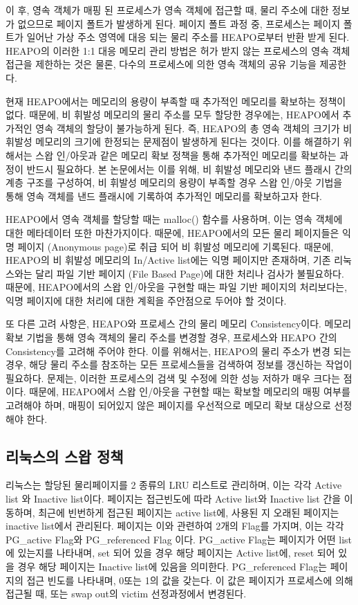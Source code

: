 \documentclass[letterpaper,twocolumn,10pt]{article}
\begin{document}
이 후, 영속 객체가 매핑 된 프로세스가 영속 객체에 접근할 때, 물리 주소에 대한 정보가 없으므로 페이지 폴트가 발생하게 된다. 페이지 폴트 과정 중, 프로세스는 페이지 폴트가 일어난 가상 주소 영역에 대응 되는 물리 주소를 HEAPO로부터 반환 받게 된다. HEAPO의 이러한 1:1 대응 메모리 관리 방법은 허가 받지 않는 프로세스의 영속 객체 접근을 제한하는 것은 물론, 다수의 프로세스에 의한 영속 객체의 공유 기능을 제공한다.

현재 HEAPO에서는 메모리의 용량이 부족할 때 추가적인 메모리를 확보하는 정책이 없다. 때문에, 비 휘발성 메모리의 물리 주소를 모두 할당한 경우에는, HEAPO에서 추가적인 영속 객체의 할당이 불가능하게 된다. 즉, HEAPO의 총 영속 객체의 크기가 비 휘발성 메모리의 크기에 한정되는 문제점이 발생하게 된다는 것이다. 이를 해결하기 위해서는 스왑 인/아웃과 같은 메모리 확보 정책을 통해 추가적인 메모리를 확보하는 과정이 반드시 필요하다. 본 논문에서는 이를 위해, 비 휘발성 메모리와 낸드 플래시 간의 계층 구조를 구성하여, 비 휘발성 메모리의 용량이 부족할 경우 스왑 인/아웃 기법을 통해 영속 객체를 낸드 플래시에 기록하여 추가적인 메모리를 확보하고자 한다. 

HEAPO에서 영속 객체를 할당할 때는 malloc() 함수를 사용하며, 이는 영속 객체에 대한 메타데이터 또한 마찬가지이다. 때문에, HEAPO에서의 모든 물리 페이지들은 익명 페이지 (Anonymous page)로 취급 되어 비 휘발성 메모리에 기록된다. 때문에, HEAPO의 비 휘발성 메모리의 In/Active list에는 익명 페이지만 존재하며, 기존 리눅스와는 달리 파일 기반 페이지 (File Based Page)에 대한 처리나 검사가 불필요하다. 때문에, HEAPO에서의 스왑 인/아웃을 구현할 때는 파일 기반 페이지의 처리보다는, 익명 페이지에 대한 처리에 대한 계획을 주안점으로 두어야 할 것이다. 

또 다른 고려 사항은, HEAPO와 프로세스 간의 물리 메모리 Consistency이다. 메모리 확보 기법을 통해 영속 객체의 물리 주소를 변경할 경우, 프로세스와 HEAPO 간의 Consistency를 고려해 주어야 한다. 이를 위해서는, HEAPO의 물리 주소가 변경 되는 경우, 해당 물리 주소를 참조하는 모든 프로세스들을 검색하여 정보를 갱신하는 작업이 필요하다. 문제는, 이러한 프로세스의 검색 및 수정에 의한 성능 저하가 매우 크다는 점이다. 때문에, HEAPO에서 스왑 인/아웃을 구현할 때는 확보할 메모리의 매핑 여부를 고려해야 하며, 매핑이 되어있지 않은 페이지를 우선적으로 메모리 확보 대상으로 선정해야 한다.

\subsection{리눅스의 스왑 정책}

리눅스는 할당된 물리페이지를 2 종류의 LRU 리스트로 관리하며, 이는 각각 Active list 와 Inactive list이다. 페이지는 접근빈도에 따라 Active list와 Inactive list 간을 이동하며, 최근에 빈번하게 접근된 페이지는 active list에, 사용된 지 오래된 페이지는 inactive list에서 관리된다. 페이지는 이와 관련하여 2개의 Flag를 가지며, 이는 각각 PG\_active  Flag와 PG\_referenced Flag 이다. PG\_active Flag는 페이지가 어떤 list에 있는지를 나타내며, set 되어 있을 경우 해당 페이지는 Active list에, reset 되어 있을 경우 해당 페이지는 Inactive list에 있음을 의미한다. PG\_referenced Flag는 페이지의 접근 빈도를 나타내며, 0또는 1의 값을 갖는다. 이 값은 페이지가 프로세스에 의해 접근될 때, 또는 swap out의 victim 선정과정에서 변경된다. 
\end{document}
